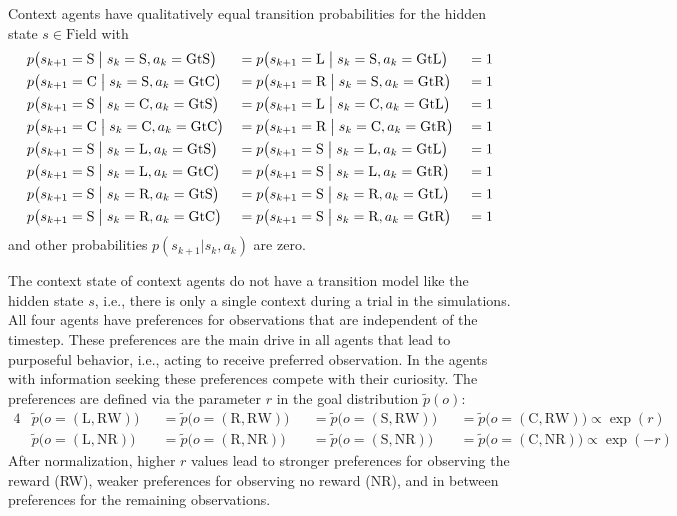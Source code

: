 Context agents have qualitatively equal transition probabilities for the hidden state \(s \in \text{Field}\) with
\begin{alignat}{3}
    & p\bigl(s_{k+1}=\text{S}\bigm|s_k=\text{S},a_k=\text{GtS}\bigr) &  & =p\bigl(s_{k+1}=\text{L}\bigm|s_k=\text{S},a_k=\text{GtL}\bigr) &  & = 1 \nonumber \\
    & p\bigl(s_{k+1}=\text{C}\bigm|s_k=\text{S},a_k=\text{GtC}\bigr) &  & =p\bigl(s_{k+1}=\text{R}\bigm|s_k=\text{S},a_k=\text{GtR}\bigr) &  & = 1 \nonumber \\
    & p\bigl(s_{k+1}=\text{S}\bigm|s_k=\text{C},a_k=\text{GtS}\bigr) &  & =p\bigl(s_{k+1}=\text{L}\bigm|s_k=\text{C},a_k=\text{GtL}\bigr) &  & = 1 \nonumber \\
    & p\bigl(s_{k+1}=\text{C}\bigm|s_k=\text{C},a_k=\text{GtC}\bigr) &  & =p\bigl(s_{k+1}=\text{R}\bigm|s_k=\text{C},a_k=\text{GtR}\bigr) &  & = 1 \nonumber \\
    & p\bigl(s_{k+1}=\text{S}\bigm|s_k=\text{L},a_k=\text{GtS}\bigr) &  & =p\bigl(s_{k+1}=\text{S}\bigm|s_k=\text{L},a_k=\text{GtL}\bigr) &  & = 1 \nonumber \\
    & p\bigl(s_{k+1}=\text{S}\bigm|s_k=\text{L},a_k=\text{GtC}\bigr) &  & =p\bigl(s_{k+1}=\text{S}\bigm|s_k=\text{L},a_k=\text{GtR}\bigr) &  & = 1 \nonumber \\
    & p\bigl(s_{k+1}=\text{S}\bigm|s_k=\text{R},a_k=\text{GtS}\bigr) &  & =p\bigl(s_{k+1}=\text{S}\bigm|s_k=\text{R},a_k=\text{GtL}\bigr) &  & = 1 \nonumber \\
    & p\bigl(s_{k+1}=\text{S}\bigm|s_k=\text{R},a_k=\text{GtC}\bigr) &  & =p\bigl(s_{k+1}=\text{S}\bigm|s_k=\text{R},a_k=\text{GtR}\bigr) &  & = 1
\end{alignat}
and other probabilities \(p(s_{k+1}|s_k,a_k)\) are zero.

The context state of context agents do not have a transition model like the hidden state \(s\), i.e., there is only a single context during a trial in the simulations.
All four agents have preferences for observations that are independent of the timestep. These preferences are the main drive in all agents that lead to purposeful behavior, i.e., acting to receive preferred observation. In the agents with information seeking these preferences compete with their curiosity. The preferences are defined via the parameter \(r\) in the goal distribution \(\tilde{p}(o)\):
\begin{alignat}{4}
    & \tilde{p}\bigl(o=(\text{L},\text{RW})\bigr) &  & =\tilde{p}\bigl(o=(\text{R},\text{RW})\bigr) &  & =\tilde{p}\bigl(o=(\text{S},\text{RW})\bigr) &  & =\tilde{p}\bigl(o=(\text{C},\text{RW})\bigr) \propto \exp(r) \nonumber \\
    & \tilde{p}\bigl(o=(\text{L},\text{NR})\bigr) &  & =\tilde{p}\bigl(o=(\text{R},\text{NR})\bigr) &  & =\tilde{p}\bigl(o=(\text{S},\text{NR})\bigr) &  & =\tilde{p}\bigl(o=(\text{C},\text{NR})\bigr) \propto \exp(-r)
\end{alignat}
After normalization, higher \(r\) values lead to stronger preferences for observing the reward (RW), weaker preferences for observing no reward (NR), and in between preferences for the remaining observations.

